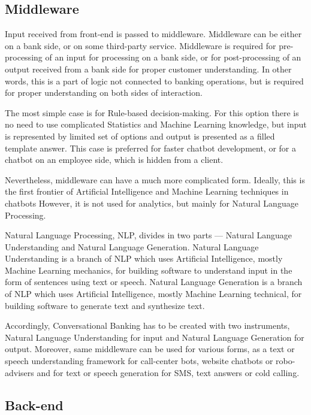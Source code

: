 \subsection{Middleware}

Input received from front-end is passed to middleware.
Middleware can be either on a bank side, or on some third-party service.
Middleware is required for pre-processing of an input for processing on a bank side, or for post-processing of an output received from a bank side for proper customer understanding.
In other words, this is a part of logic not connected to banking operations, but is required for proper understanding on both sides of interaction.

The most simple case is for Rule-based decision-making.
For this option there is no need to use complicated Statistics and Machine Learning knowledge, but input is represented by limited set of options and output is presented as a filled template answer.
This case is preferred for faster chatbot development, or for a chatbot on an employee side, which is hidden from a client. 

Nevertheless, middleware can have a much more complicated form.
Ideally, this is the first frontier of Artificial Intelligence and Machine Learning techniques in chatbots
However, it is not used for analytics, but mainly for Natural Language Processing.

Natural Language Processing, NLP, divides in two parts — Natural Language Understanding and Natural Language Generation.
Natural Language Understanding is a branch of NLP which uses Artificial Intelligence, mostly Machine Learning mechanics, for building software to understand input in the form of sentences using text or speech.
Natural Language Generation is a branch of NLP which uses Artificial Intelligence, mostly Machine Learning technical, for building software to generate text and synthesize text.

Accordingly, Conversational Banking has to be created with two instruments, Natural Language Understanding for input and Natural Language Generation for output.
Moreover, same middleware can be used for various forms, as a text or speech understanding framework for call-center bots, website chatbots or robo-advisers and for text or speech generation for SMS, text answers or cold calling.
 

\subsection{Back-end}

